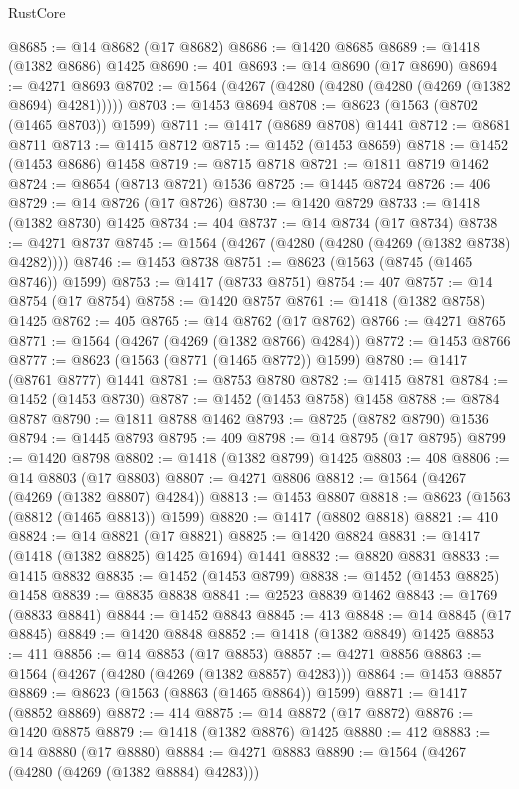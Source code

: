 \begin{lexlean}{RustCore}
\begin{coremodule}
@8685 := @14 @8682 (@17 @8682)
@8686 := @1420 @8685
@8689 := @1418 (@1382 @8686) @1425
@8690 := 401
@8693 := @14 @8690 (@17 @8690)
@8694 := @4271 @8693
@8702 := @1564 (@4267 (@4280 (@4280 (@4280 (@4269 (@1382 @8694) @4281)))))
@8703 := @1453 @8694
@8708 := @8623 (@1563 (@8702 (@1465 @8703)) @1599)
@8711 := @1417 (@8689 @8708) @1441
@8712 := @8681 @8711
@8713 := @1415 @8712
@8715 := @1452 (@1453 @8659)
@8718 := @1452 (@1453 @8686) @1458
@8719 := @8715 @8718
@8721 := @1811 @8719 @1462
@8724 := @8654 (@8713 @8721) @1536
@8725 := @1445 @8724
@8726 := 406
@8729 := @14 @8726 (@17 @8726)
@8730 := @1420 @8729
@8733 := @1418 (@1382 @8730) @1425
@8734 := 404
@8737 := @14 @8734 (@17 @8734)
@8738 := @4271 @8737
@8745 := @1564 (@4267 (@4280 (@4280 (@4269 (@1382 @8738) @4282))))
@8746 := @1453 @8738
@8751 := @8623 (@1563 (@8745 (@1465 @8746)) @1599)
@8753 := @1417 (@8733 @8751)
@8754 := 407
@8757 := @14 @8754 (@17 @8754)
@8758 := @1420 @8757
@8761 := @1418 (@1382 @8758) @1425
@8762 := 405
@8765 := @14 @8762 (@17 @8762)
@8766 := @4271 @8765
@8771 := @1564 (@4267 (@4269 (@1382 @8766) @4284))
@8772 := @1453 @8766
@8777 := @8623 (@1563 (@8771 (@1465 @8772)) @1599)
@8780 := @1417 (@8761 @8777) @1441
@8781 := @8753 @8780
@8782 := @1415 @8781
@8784 := @1452 (@1453 @8730)
@8787 := @1452 (@1453 @8758) @1458
@8788 := @8784 @8787
@8790 := @1811 @8788 @1462
@8793 := @8725 (@8782 @8790) @1536
@8794 := @1445 @8793
@8795 := 409
@8798 := @14 @8795 (@17 @8795)
@8799 := @1420 @8798
@8802 := @1418 (@1382 @8799) @1425
@8803 := 408
@8806 := @14 @8803 (@17 @8803)
@8807 := @4271 @8806
@8812 := @1564 (@4267 (@4269 (@1382 @8807) @4284))
@8813 := @1453 @8807
@8818 := @8623 (@1563 (@8812 (@1465 @8813)) @1599)
@8820 := @1417 (@8802 @8818)
@8821 := 410
@8824 := @14 @8821 (@17 @8821)
@8825 := @1420 @8824
@8831 := @1417 (@1418 (@1382 @8825) @1425 @1694) @1441
@8832 := @8820 @8831
@8833 := @1415 @8832
@8835 := @1452 (@1453 @8799)
@8838 := @1452 (@1453 @8825) @1458
@8839 := @8835 @8838
@8841 := @2523 @8839 @1462
@8843 := @1769 (@8833 @8841)
@8844 := @1452 @8843
@8845 := 413
@8848 := @14 @8845 (@17 @8845)
@8849 := @1420 @8848
@8852 := @1418 (@1382 @8849) @1425
@8853 := 411
@8856 := @14 @8853 (@17 @8853)
@8857 := @4271 @8856
@8863 := @1564 (@4267 (@4280 (@4269 (@1382 @8857) @4283)))
@8864 := @1453 @8857
@8869 := @8623 (@1563 (@8863 (@1465 @8864)) @1599)
@8871 := @1417 (@8852 @8869)
@8872 := 414
@8875 := @14 @8872 (@17 @8872)
@8876 := @1420 @8875
@8879 := @1418 (@1382 @8876) @1425
@8880 := 412
@8883 := @14 @8880 (@17 @8880)
@8884 := @4271 @8883
@8890 := @1564 (@4267 (@4280 (@4269 (@1382 @8884) @4283)))

\end{coremodule}
\end{lexlean}
